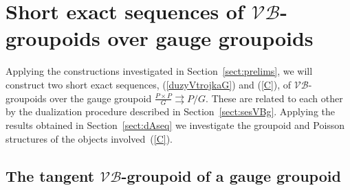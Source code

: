 \documentclass[10pt,a4paper]{amsart}
\newcommand{\tto}{\rightrightarrows}
\numberwithin{equation}{section}
\begin{document}
\section[Short exact sequences of $\mathcal{V}\!\mathcal{B}$-groupoids over gauge groupoids]{Short exact sequences of $\boldsymbol{\mathcal{V}\!\mathcal{B}}$-groupoids over gauge groupoids}\label{sect:VBgauge}

Applying the constructions investigated in Section~\ref{sect:prelims}, we will construct two short exact sequences, (\ref{duzyVtrojkaG}) and (\ref{C}), of $\mathcal{V}\!\mathcal{B}$-groupoids over the gauge groupoid $\frac{P\times P}{G}\tto P/G$. These are related to each other by the dualization procedure described in Section~\ref{sect:sesVBg}. Applying the results obtained in Section~\ref{sect:dAseq} we investigate the groupoid and Poisson structures of the objects involved~(\ref{C}).

\subsection[The tangent $\mathcal{V}\!\mathcal{B}$-groupoid of a gauge groupoid]{The tangent $\boldsymbol{\mathcal{V}\!\mathcal{B}}$-groupoid of a gauge groupoid}
\end{document}
